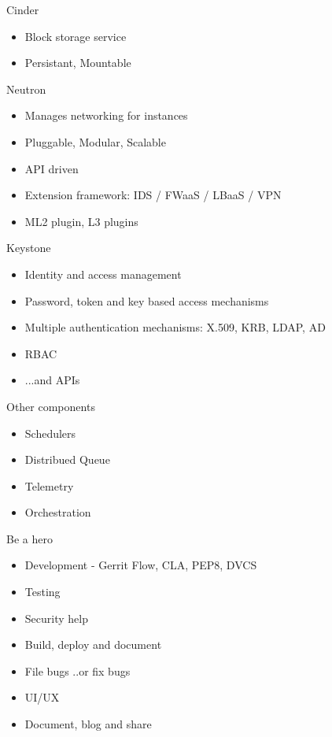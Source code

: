 \documentclass{beamer}
\begin{document}
\begin{frame}{Cinder}
\begin{itemize}
 \item Block storage service
 \item Persistant, Mountable
\end{itemize}
\end{frame}

\begin{frame}{Neutron}
\begin{itemize}
 \item Manages networking for instances
 \item Pluggable, Modular, Scalable
 \item API driven
 \item Extension framework: IDS / FWaaS / LBaaS / VPN
 \item ML2 plugin, L3 plugins
\end{itemize}
\end{frame}


\begin{frame}{Keystone}
\begin{itemize}
 \item Identity and access management
 \item Password, token and key based access mechanisms
 \item Multiple authentication mechanisms: X.509, KRB, LDAP, AD
 \item RBAC
 \item ...and APIs
\end{itemize}
\end{frame}

\begin{frame}{Other components}
\begin{itemize}
 \item Schedulers
 \item Distribued Queue
 \item Telemetry
 \item Orchestration
\end{itemize}
\end{frame}

\begin{frame}{Be a hero}
\begin{itemize}
 \item Development - Gerrit Flow, CLA, PEP8, DVCS 
 \item Testing 
 \item Security help
 \item Build, deploy and document
 \item File bugs ..or fix bugs
 \item UI/UX
 \item Document, blog and share
\end{itemize}
\end{frame}
\end{document}
